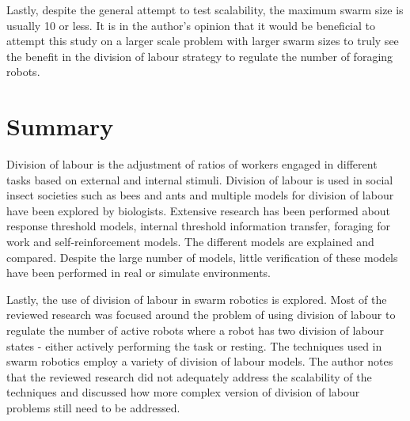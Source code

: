 Lastly, despite the general attempt to test scalability, the maximum swarm size is usually 10 or less. It is in the author's opinion that it would be beneficial to attempt this study on a larger scale problem with larger swarm sizes to truly see the benefit in the division of labour strategy to regulate the number of foraging robots. 

\section{Summary}
\label{sec:second:summary}
Division of labour is the adjustment of ratios of workers engaged in different tasks based on external and internal stimuli. Division of labour is used in social insect societies such as bees and ants and multiple models for division of labour have been explored by biologists. Extensive research has been performed about response threshold models, internal threshold information transfer, foraging for work and self-reinforcement models. The different models are explained and compared. Despite the large number of models, little verification of these models have been performed in real or simulate environments. 

Lastly, the use of division of labour in swarm robotics is explored. Most of the reviewed research was focused around the problem of using division of labour to regulate the number of active robots where a robot has two division of labour states - either actively performing the task or resting. The techniques used in swarm robotics employ a variety of division of labour models. The author notes that the reviewed research did not adequately address the scalability of the techniques and discussed how more complex version of division of labour problems still need to be addressed.